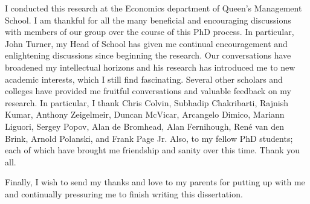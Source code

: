 \documentclass[11pt,fleqn]{book}
\begin{document}
I conducted this research at the Economics department of Queen's Management School. I am thankful for all the many beneficial and encouraging discussions with members of our group over the course of this PhD process. In particular, John Turner, my Head of School has given me continual encouragement and enlightening discussions since beginning the research. Our conversations have broadened my intellectual horizons and his research has introduced me to new academic interests, which I still find fascinating. Several other scholars and colleges have provided me fruitful conversations and valuable feedback on my research. In particular, I thank Chris Colvin, Subhadip Chakribarti, Rajnish Kumar, Anthony Zeigelmeir, Duncan McVicar, Arcangelo Dimico, Mariann Liguori, Sergey Popov, Alan de Bromhead, Alan Fernihough, Ren\'e van den Brink, Arnold Polanski, and Frank Page Jr. Also, to my fellow PhD students; each of which have brought me friendship and sanity over this time. Thank you all.

Finally, I wish to send my thanks and love to my parents for putting up with me and continually pressuring me to finish writing this dissertation.

\newpage
\mbox{}
\thispagestyle{empty}
\newpage

\setcounter{page}{1} 
\end{document}
